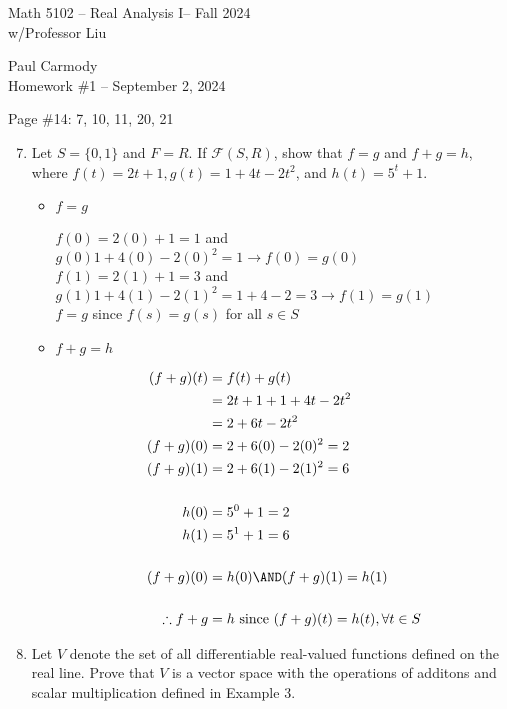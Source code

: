 \documentclass[10pt,a4paper]{report}
\newcommand{\CLASSNAME}{Math 5102 -- Real Analysis I}
\newcommand{\STUDENTNAME}{Paul Carmody}
\newcommand{\ASSIGNMENT}{Homework \#1 }
\newcommand{\DUEDATE}{September 2, 2024}
\newcommand{\SEMESTER}{Fall 2024}
\newcommand{\FF}{\mathcal{F}}
\begin{document}
\begin{center}
	\Large{\CLASSNAME -- \SEMESTER} \\
	\large{ w/Professor Liu}
\end{center}
\begin{center}
	\STUDENTNAME \\
	\ASSIGNMENT -- \DUEDATE\\
\end{center} 
Page \#14: 7, 10, 11, 20, 21\\
\begin{enumerate}
	\setcounter{enumi}{6}
	\item Let $S = \{0,1\}$ and $F=R$.  If $\FF(S,R)$, show that $f=g$ and $f+g=h$, where $f(t) = 2t+1, g(t)=1+4t-2t^2$, and $h(t) = 5^t+1$.
	\begin{itemize}
		\item $f=g$
		
		$f(0)= 2(0)+1=1$ and $g(0)1+4(0)-2(0)^2=1 \to f(0) = g(0)$\\
		$f(1)= 2(1)+1=3$ and $g(1)1+4(1)-2(1)^2=1+4-2=3 \to f(1) = g(1)$\\
		$f=g$ since $f(s)=g(s)$ for all $s \in S$
		
		\item $f+g = h$
		
		\begin{align*}
			(f+g)(t) &= f(t)+g(t)\\
			&=2t+1+1+4t-2t^2 \\
			&= 2+6t-2t^2 \\
			(f+g)(0) &= 2+6(0)-2(0)^2 = 2 \\
			(f+g)(1) &= 2+6(1)-2(1)^2 = 6 \\ \\
			h(0) &= 5^0+1 = 2 \\
			h(1) &= 5^1+1 = 6 \\ \\
			(f+g)(0) &= h(0) \AND (f+g)(1) = h(1) \\ \\
			\therefore f+g &= h \text{ since } (f+g)(t) = h(t), \forall t \in S
		\end{align*}
	\end{itemize}
	
	\setcounter{enumi}{9}
	\item Let $V$ denote the set of all differentiable real-valued functions defined on the real line.  Prove that $V$ is a vector space with the operations of additons and scalar multiplication defined in Example 3.
	

\end{enumerate}
\end{document}
